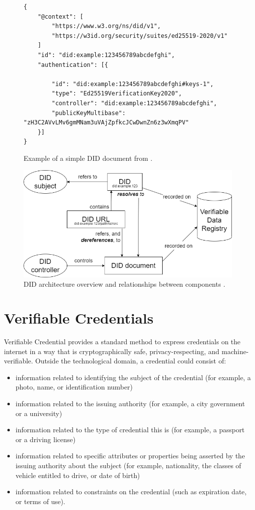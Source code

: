 \begin{figure}[h!]
\begin{lstlisting}[style=json,frame=single]
{
    "@context": [
        "https://www.w3.org/ns/did/v1",
        "https://w3id.org/security/suites/ed25519-2020/v1"
    ]
    "id": "did:example:123456789abcdefghi",
    "authentication": [{

        "id": "did:example:123456789abcdefghi#keys-1",
        "type": "Ed25519VerificationKey2020",
        "controller": "did:example:123456789abcdefghi",
        "publicKeyMultibase": "zH3C2AVvLMv6gmMNam3uVAjZpfkcJCwDwnZn6z3wXmqPV"
    }]
}
\end{lstlisting}
\caption{Example of a simple DID document from \cite{didW3C}. \label{didDocExample}}
\end{figure}

\begin{figure}[h!]
    \centering
    \includegraphics[width=12cm]{./chapters/images/did-overview.png}
    \caption{DID architecture overview and relationships between components \cite{didW3C}.}
    \label{didOverview}
\end{figure}

\section{Verifiable Credentials}
Verifiable Credential \cite{vcW3C} provides a standard method to express credentials on the internet in a way that is cryptographically safe, privacy-respecting, and machine-verifiable.
Outside the technological domain, a credential could consist of:
\begin{itemize}
    \item information related to identifying the subject of the credential (for example, a photo, name, or identification number)
    \item information related to the issuing authority (for example, a city government or a university)
    \item information related to the type of credential this is (for example, a passport or a driving license)
    \item information related to specific attributes or properties being asserted by the issuing authority about the subject (for example, nationality, the classes of vehicle entitled to drive, or date of birth)
    \item information related to constraints on the credential (such as expiration date, or terms of use). 
\end{itemize}

